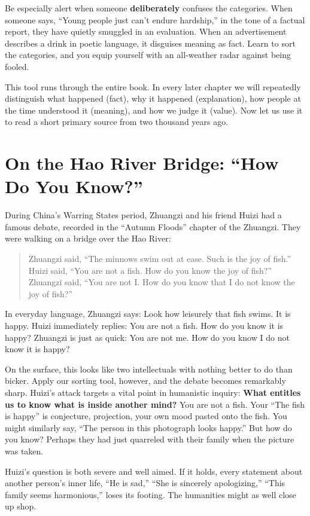 Be especially alert when someone \textbf{deliberately} confuses the categories. When someone says, ``Young people just can't endure hardship,'' in the tone of a factual report, they have quietly smuggled in an evaluation. When an advertisement describes a drink in poetic language, it disguises meaning as fact. Learn to sort the categories, and you equip yourself with an all-weather radar against being fooled.

This tool runs through the entire book. In every later chapter we will repeatedly distinguish what happened (fact), why it happened (explanation), how people at the time understood it (meaning), and how we judge it (value). Now let us use it to read a short primary source from two thousand years ago.

\section{On the Hao River Bridge: ``How Do You Know?''}
During China's Warring States period, Zhuangzi and his friend Huizi had a famous debate, recorded in the ``Autumn Floods'' chapter of the Zhuangzi. They were walking on a bridge over the Hao River:

\begin{quote}
Zhuangzi said, ``The minnows swim out at ease. Such is the joy of fish.'' Huizi said, ``You are not a fish. How do you know the joy of fish?'' Zhuangzi said, ``You are not I. How do you know that I do not know the joy of fish?''
\end{quote}
In everyday language, Zhuangzi says: Look how leisurely that fish swims. It is happy. Huizi immediately replies: You are not a fish. How do you know it is happy? Zhuangzi is just as quick: You are not me. How do you know I do not know it is happy?

On the surface, this looks like two intellectuals with nothing better to do than bicker. Apply our sorting tool, however, and the debate becomes remarkably sharp. Huizi's attack targets a vital point in humanistic inquiry: \textbf{What entitles us to know what is inside another mind?} You are not a fish. Your ``The fish is happy'' is conjecture, projection, your own mood pasted onto the fish. You might similarly say, ``The person in this photograph looks happy.'' But how do you know? Perhaps they had just quarreled with their family when the picture was taken.

Huizi's question is both severe and well aimed. If it holds, every statement about another person's inner life, ``He is sad,'' ``She is sincerely apologizing,'' ``This family seems harmonious,'' loses its footing. The humanities might as well close up shop.

